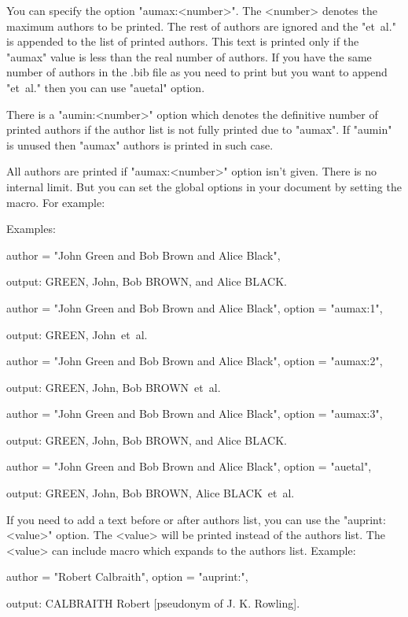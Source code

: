 You can specify the option "aumax:<number>". The <number> denotes the
maximum authors to be printed. The rest of authors are ignored and the
"et~al." is appended to the list of printed authors. This text is
printed only if the "aumax" value is less than the real number of authors. 
If you have the same number of authors in the .bib file as you need to print
but you want to append "et~al." then you can use "auetal" option.

There is a "aumin:<number>" option which denotes the definitive number of 
printed authors if the author list is not fully printed due to "aumax".
If "aumin" is unused then "aumax" authors is printed in such case.

All authors are printed if "aumax:<number>" option isn't given. 
There is no internal limit. But you can set the global options in 
your document by setting the \biboptions macro. For example:

   \def\biboptions {aumax:7 aumin:1}  

Examples:

   author = "John Green and Bob Brown and Alice Black",

output:    GREEN, John, Bob BROWN, and Alice BLACK.

   author = "John Green and Bob Brown and Alice Black",
   option = "aumax:1",

output:    GREEN, John~et~al.

   author = "John Green and Bob Brown and Alice Black",
   option = "aumax:2",

output:    GREEN, John, Bob BROWN~et~al.

   author = "John Green and Bob Brown and Alice Black",
   option = "aumax:3",

output:    GREEN, John, Bob BROWN, and Alice BLACK.

   author = "John Green and Bob Brown and Alice Black",
   option = "auetal",
   
output:    GREEN, John, Bob BROWN, Alice BLACK~et~al.

If you need to add a text before or after authors list, you can use
the "auprint:{<value>}" option. The <value> will be printed instead of the
authors list. The <value> can include \AU macro which expands to the authors
list. Example:

   author = "Robert Calbraith",
   option = "auprint:{\AU{}}",

output:    CALBRAITH Robert [pseudonym of J. K. Rowling].

